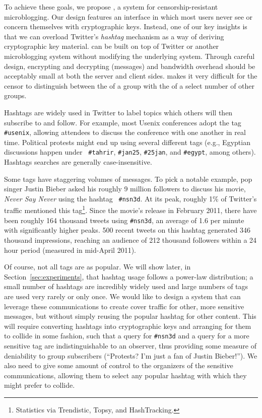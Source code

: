 To achieve these goals, we propose \hoot, a system for
censorship-resistant microblogging. Our design features an interface in
which most users never see or concern themselves with cryptographic
keys. Instead, one of our key insights is that we can overload Twitter's
{\em hashtag} mechanism as a way of deriving cryptographic key
material. \hoot can be built on top of Twitter or another microblogging
system without modifying the underlying system. Through careful design,
encrypting and decrypting {\em \msgs} (\hoot messages) and bandwidth
overhead should be acceptably small at both the server and client sides.
\hoot makes it very difficult for the censor to distinguish between the
\msgs of a group with the \msgs of a select number of other groups.


Hashtags are widely used in Twitter to label topics which others will
then subscribe to and follow. For example, most Usenix conferences adopt
the tag {\tt \#usenix}, allowing attendees to discuss the conference
with one another in real time. Political protests might end up using
several different tags (e.g., Egyptian discussions happen under {\tt
  \#tahrir}, {\tt \#jan25}, {\tt \#25jan}, and {\tt \#egypt}, among
others). Hashtags searches are generally case-insensitive.

Some tags have staggering volumes of messages. To pick a notable
example, pop singer Justin Bieber asked his roughly 9 million followers
to discuss his movie, {\em Never Say Never} using the hashtag {\tt
  \#nsn3d}. At its peak, roughly 1\% of Twitter's traffic mentioned this
tag\footnote{Statistics via Trendistic, Topsy, and HashTracking.}. Since
the movie's release in February 2011, there have been roughly 164
thousand tweets using {\tt \#nsn3d}, an average of 1.6 per minute with
significantly higher peaks. 500 recent tweets on this hashtag generated
346 thousand impressions, reaching an audience of 212 thousand followers
within a 24 hour period (measured in mid-April 2011).

Of course, not all tags are as popular. We will show later, in
Section~\ref{sec:experiments}, that hashtag usage follows a power-law
distribution; a small number of hashtags are incredibly widely used and
large numbers of tags are used very rarely or only once. We would like
to design a system that can leverage these communications to create
cover traffic for other, more sensitive messages, but without simply
reusing the popular hashtag for other content. This will require
converting hashtags into cryptographic keys and arranging for them to
collide in some fashion, such that a query for {\tt \#nsn3d} and a query
for a more sensitive tag are indistinguishable to an observer, thus
providing some measure of deniability to group subscribers (``Protests?
I'm just a fan of Justin Bieber!''). We also need to give some amount of
control to the organizers of the sensitive communications, allowing them
to select any popular hashtag with which they might prefer to collide.

